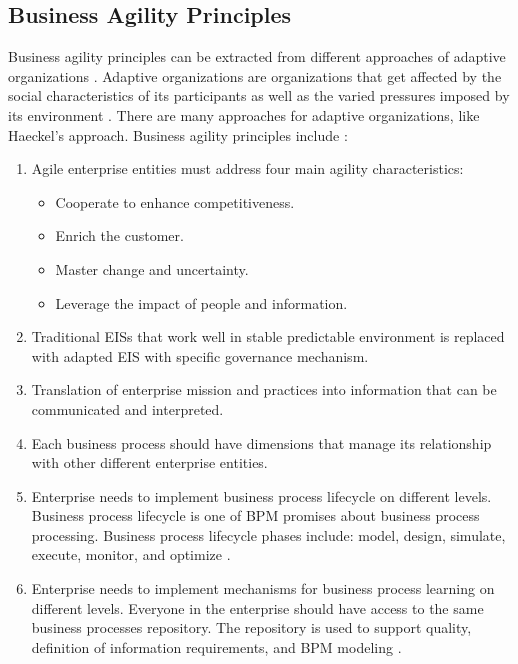 \documentclass[12pt,a4paper,final,twoside,onecolumn,titlepage]{book}
\begin{document}
\subsection{Business Agility Principles}
Business agility principles can be extracted from different approaches of adaptive organizations \cite{BS16}. Adaptive organizations are organizations that get affected by the social characteristics of its participants as well as the varied pressures imposed by its environment \cite{BS17}. There are many approaches for adaptive organizations, like Haeckel’s approach. Business agility principles include \cite{BS16,BS18}:
\begin{enumerate}
\item Agile enterprise entities must address four main agility characteristics:
\begin{itemize}
\item Cooperate to enhance competitiveness.
\item Enrich the customer.
\item Master change and uncertainty.
\item Leverage the impact of people and information.
\end{itemize}
\item Traditional \gls{EIS}s that work well in stable predictable environment is replaced with adapted \gls{EIS} with specific governance mechanism. 
\item Translation of enterprise mission and practices into information that can be communicated and interpreted.
\item Each business process should have dimensions that manage its relationship with other different enterprise entities.
\item Enterprise needs to implement business process lifecycle on different levels. Business process lifecycle is one of \gls{BPM} promises about business process processing. Business process lifecycle phases include: model, design, simulate, execute, monitor, and optimize \cite{BS19}.
\item Enterprise needs to implement mechanisms for business process learning on different levels. Everyone in the enterprise should have access to the same business processes repository. The repository is used to support quality, definition of information requirements, and \gls{BPM} modeling \cite{BS20}.
\end{enumerate}
\end{document}

